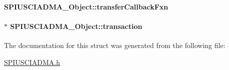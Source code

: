 \paragraph[{transfer\-Callback\-Fxn}]{ S\-P\-I\-U\-S\-C\-I\-A\-D\-M\-A\-\_\-\-Object\-::transfer\-Callback\-Fxn}\label{struct_s_p_i_u_s_c_i_a_d_m_a___object_a796145d03c0defb17215b30b51ab9605}
\paragraph[{transaction}]{$\ast$ S\-P\-I\-U\-S\-C\-I\-A\-D\-M\-A\-\_\-\-Object\-::transaction}\label{struct_s_p_i_u_s_c_i_a_d_m_a___object_ad4a7ffe0d4c63fa15828258e5b7204d0}


The documentation for this struct was generated from the following file\-:\begin{DoxyCompactItemize}
\item 
\hyperlink{_s_p_i_u_s_c_i_a_d_m_a_8h}{S\-P\-I\-U\-S\-C\-I\-A\-D\-M\-A.\-h}\end{DoxyCompactItemize}
